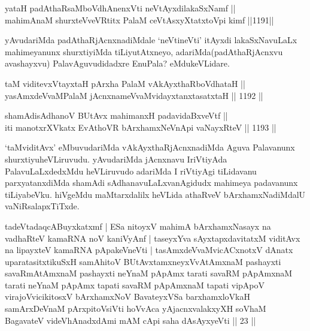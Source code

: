 
\begin{shl}
yataH padAthaRsaMboVdhAnenxVti neVtAyxdilakaSxNamf || \\
mahimAnaM shurxteVveVRtitx PalaM ceVtAsxyXtatxtoV\s pi kimf \hfill ||1191||  
\end{shl}

\begin{artha}
yAvudariMda padAthaRjAcnxnadiMdale `neVtineVti' itAyxdi lakaSxNavuLaLx mahimeyanunx shurxtiyiMda tiLiyutAtxneyo, adariMda\break (padAthaRjAcnxvu avashayxvu) PalavAguvudidadxre EnuPala? eMdu\break keVLidare.
\end{artha}

\begin{shl}
taM viditevxVtayxtaH pArxha PalaM vAkAyxthaRboVdhataH || \\
yasAmxdeVvaMPalaM jAcnxnameVvaMvidayxtanxtasatxtaH \hfill || 1192 ||  
\end{shl}
				
\begin{shl}
shamAdisAdhanoV BUtAvx mahimanxH padavidaBxveVtf ||  \\
iti manotxrXVkatx EvAthoVR bArxhamxNeVnApi vaNayxRteV \hfill || 1193 ||  
\end{shl}


\begin{artha}
`taMviditAvx' eMbuvudariMda vAkAyxthaRjAcnxnadiMda Aguva Palavanunx shurxtiyuheVLiruvudu. yAvudariMda jAcnxnavu IriVtiyAda PalavuLaLxdedxMdu heVLiruvudo adariMda I riVtiyAgi tiLidavanu parxyatanxdiMda shamAdi sAdhanavuLaLxvanAgidudx mahimeya padavanunx tiLiyabeVku. hiVgeMdu maMtarxdalilx heVLida athaRveV bArxhamxNadiMdalU vaNiRsalapxTiTxde.
\end{artha}


\begin {kandikeshl}
tadeVtadaqcABuyxkatxmf | ESa nitoyxV mahimA bArxhamxNasayx na vadhaRteV kamaRNA noV kaniVyAnf | taseyxYva sAyxtapxdavitatxM viditAvx na lipayxteV kamaRNA pApakeVneVti | tasAmxdeVvaMvicACxnotxV dAnatx uparatasitxtikuSxH samAhitoV BUtAvxtamxneyxVvAtAmxnaM pashayxti savaRmAtAmxnaM pashayxti neYnaM pApAmx tarati savaRM pApAmxnaM tarati neYnaM pApAmx tapati savaRM pApAmxnaM tapati vipApoV virajoV\s vicikitosxV bArxhamxNoV BavateyxVSa barxhamxloVkaH samArxDeVnaM pArxpitoV\s siVti hoVvAca yAjacnxvalakxyXH soV\s haM BagavateV videVhAnadxdAmi mAM cApi saha dAsAyxyeVti || 23 ||
\end{kandikeshl}

